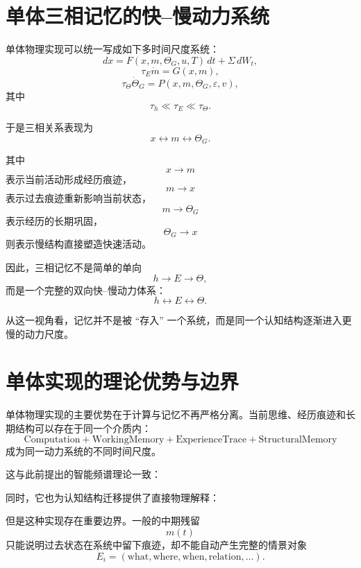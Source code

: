 \section{单体三相记忆的快--慢动力系统}

单体物理实现可以统一写成如下多时间尺度系统：
\[
dx
=
F(x,m,\Theta_G,u,T)\,dt
+
\Sigma\,dW_t,
\]
\[
\tau_E\dot m
=
G(x,m),
\]
\[
\tau_\Theta\dot\Theta_G
=
P(x,m,\Theta_G,\varepsilon,v),
\]
其中
\[
\tau_h
\ll
\tau_E
\ll
\tau_\Theta.
\]

于是三相关系表现为
\[
x
\leftrightarrow
m
\leftrightarrow
\Theta_G.
\]

其中
\[
x\rightarrow m
\]
表示当前活动形成经历痕迹，
\[
m\rightarrow x
\]
表示过去痕迹重新影响当前状态，
\[
m\rightarrow\Theta_G
\]
表示经历的长期巩固，
\[
\Theta_G\rightarrow x
\]
则表示慢结构直接塑造快速活动。

因此，三相记忆不是简单的单向
\[
h\rightarrow E\rightarrow\Theta,
\]
而是一个完整的双向快--慢动力体系：
\[
\boxed{
h
\leftrightarrow
E
\leftrightarrow
\Theta.
}
\]

从这一视角看，记忆并不是被 ``存入'' 一个系统，而是同一个认知结构逐渐进入更慢的动力尺度。

\section{单体实现的理论优势与边界}

单体物理实现的主要优势在于计算与记忆不再严格分离。当前思维、经历痕迹和长期结构可以存在于同一个介质内：
\[
\mathrm{Computation}
+
\mathrm{WorkingMemory}
+
\mathrm{ExperienceTrace}
+
\mathrm{StructuralMemory}
\]
成为同一动力系统的不同时间尺度。

这与此前提出的智能频谱理论一致：
\begin{statementbox}
\centering
{}
\end{statementbox}

同时，它也为认知结构迁移提供了直接物理解释：
\begin{statementbox}
\centering
{}
\end{statementbox}

但是这种实现存在重要边界。一般的中期残留
\[
m(t)
\]
只能说明过去状态在系统中留下痕迹，却不能自动产生完整的情景对象
\[
E_i
=
(
\mathrm{what},
\mathrm{where},
\mathrm{when},
\mathrm{relation},
\ldots
).
\]

